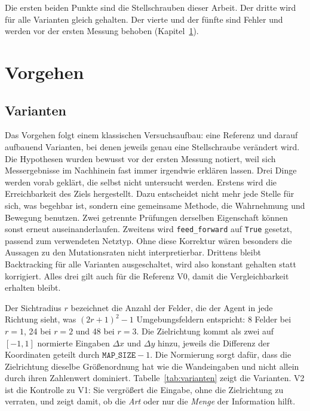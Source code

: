 \documentclass[sigconf]{acmart}
\begin{document}
Die ersten beiden Punkte sind die Stellschrauben dieser Arbeit. Der dritte wird für alle Varianten gleich gehalten. Der vierte und der fünfte sind Fehler und werden vor der ersten Messung behoben (Kapitel~\ref{sec:vorgehen}).

\section{Vorgehen}
\label{sec:vorgehen}

\subsection{Varianten}
Das Vorgehen folgt einem klassischen Versuchsaufbau: eine Referenz und darauf aufbauend Varianten, bei denen jeweils genau eine Stellschraube verändert wird. Die Hypothesen wurden bewusst vor der ersten Messung notiert, weil sich Messergebnisse im Nachhinein fast immer irgendwie erklären lassen. Drei Dinge werden vorab geklärt, die selbst nicht untersucht werden. Erstens wird die Erreichbarkeit des Ziels hergestellt. Dazu entscheidet nicht mehr jede Stelle für sich, was begehbar ist, sondern eine gemeinsame Methode, die Wahrnehmung und Bewegung benutzen. Zwei getrennte Prüfungen derselben Eigenschaft können sonst erneut auseinanderlaufen. Zweitens wird \texttt{feed\_forward} auf \texttt{True} gesetzt, passend zum verwendeten Netztyp. Ohne diese Korrektur wären besonders die Aussagen zu den Mutationsraten nicht interpretierbar. Drittens bleibt Backtracking für alle Varianten ausgeschaltet, wird also konstant gehalten statt korrigiert. Alles drei gilt auch für die Referenz V0, damit die Vergleichbarkeit erhalten bleibt.

Der Sichtradius $r$ bezeichnet die Anzahl der Felder, die der Agent in jede Richtung sieht, was $(2r+1)^2-1$ Umgebungsfeldern entspricht: 8 Felder bei $r=1$, 24 bei $r=2$ und 48 bei $r=3$. Die Zielrichtung kommt als zwei auf $[-1,1]$ normierte Eingaben $\Delta x$ und $\Delta y$ hinzu, jeweils die Differenz der Koordinaten geteilt durch $\texttt{MAP\_SIZE}-1$. Die Normierung sorgt dafür, dass die Zielrichtung dieselbe Größenordnung hat wie die Wandeingaben und nicht allein durch ihren Zahlenwert dominiert. Tabelle~\ref{tab:varianten} zeigt die Varianten. V2 ist die Kontrolle zu V1: Sie vergrößert die Eingabe, ohne die Zielrichtung zu verraten, und zeigt damit, ob die \emph{Art} oder nur die \emph{Menge} der Information hilft.
\end{document}
